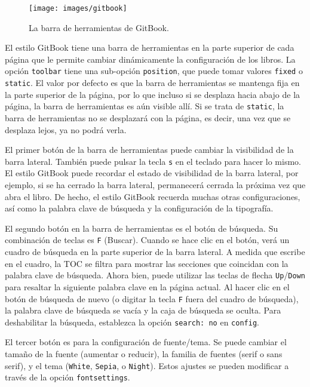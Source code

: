 \documentclass[12pt,]{krantz}
\theoremstyle{definition}
\theoremstyle{definition}
\theoremstyle{definition}
\theoremstyle{remark}
\begin{document}
\begin{figure}
\texttt{[image: images/gitbook]} \caption{La barra de herramientas de GitBook.}\label{fig:gitbook-toolbar}
\end{figure}

El estilo GitBook tiene una barra de herramientas en la parte superior
de cada página que le permite cambiar dinámicamente la configuración de
los libros. La opción \texttt{toolbar} tiene una sub-opción
\texttt{position}, que puede tomar valores \texttt{fixed} o
\texttt{static}. El valor por defecto es que la barra de herramientas se
mantenga fija en la parte superior de la página, por lo que incluso si
se desplaza hacia abajo de la página, la barra de herramientas es aún
visible allí. Si se trata de \texttt{static}, la barra de herramientas
no se desplazará con la página, es decir, una vez que se desplaza lejos,
ya no podrá verla.

El primer botón de la barra de herramientas puede cambiar la visibilidad
de la barra lateral. También puede pulsar la tecla \texttt{s} en el
teclado para hacer lo mismo. El estilo GitBook puede recordar el estado
de visibilidad de la barra lateral, por ejemplo, si se ha cerrado la
barra lateral, permanecerá cerrada la próxima vez que abra el libro. De
hecho, el estilo GitBook recuerda muchas otras configuraciones, así como
la palabra clave de búsqueda y la configuración de la tipografía.

El segundo botón en la barra de herramientas es el botón de búsqueda. Su
combinación de teclas es \texttt{F} (Buscar). Cuando se hace clic en el
botón, verá un cuadro de búsqueda en la parte superior de la barra
lateral. A medida que escribe en el cuadro, la TOC se filtra para
mostrar las secciones que coincidan con la palabra clave de búsqueda.
Ahora bien, puede utilizar las teclas de flecha
\texttt{Up}/\texttt{Down} para resaltar la siguiente palabra clave en la
página actual. Al hacer clic en el botón de búsqueda de nuevo (o digitar
la tecla \texttt{F} fuera del cuadro de búsqueda), la palabra clave de
búsqueda se vacía y la caja de búsqueda se oculta. Para deshabilitar la
búsqueda, establezca la opción \texttt{search:\ no} en \texttt{config}.

El tercer botón es para la configuración de fuente/tema. Se puede
cambiar el tamaño de la fuente (aumentar o reducir), la familia de
fuentes (serif o sans serif), y el tema (\texttt{White}, \texttt{Sepia},
o \texttt{Night}). Estos ajustes se pueden modificar a través de la
opción \texttt{fontsettings}.
\end{document}
